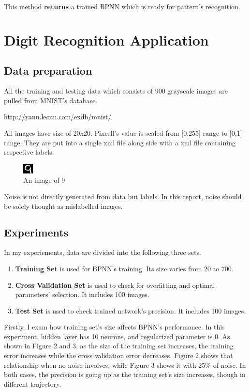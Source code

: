 \documentclass[a4paper, 11pt]{article}
\begin{document}
This method \textbf{returns} a trained BPNN which is ready for pattern's recognition.

\newpage
\section{Digit Recognition Application}
\subsection{Data preparation}
All the training and testing data which consists of 900 grayscale images are pulled from MNIST's database.
\begin{center}\url{http://yann.lecun.com/exdb/mnist/}\end{center}
All images have size of 20x20. Pixcell's value is scaled from [0,255] range to [0,1] range. They are put into a single xml file along side with a xml file containing respective labels.
\begin{figure}[ht]
  \centering
  \includegraphics[scale=5]{img0014}
  \caption{An image of 9}
  \label{fig:9}
\end{figure}
Noise is not directly generated from data but labels. In this report, noise should be solely thought as mislabelled images.
\subsection{Experiments}
In my experiements, data are divided into the following three sets.
\begin{enumerate}
\item \textbf{Training Set} is used for BPNN's training. Its size varies from 20 to 700.
\item \textbf{Cross Validation Set} is used to check for overfitting and optimal parameters' selection. It includes 100 images.
\item \textbf{Test Set} is used to check trained network's precision. It includes 100 images.
\end{enumerate}
Firstly, I exam how training set's size affects BPNN's performance. In this experiment, hidden layer has 10 neurons, and regularized parameter is 0. As shown in Figure 2 and 3, as the size of the training set increases, the training error increases while the cross validation error decreases. Figure 2 shows that relationship when no noise involves, while Figure 3 shows it with 25\% of noise. In both cases, the precision is going up as the training set's size increases, though in different trajectory.
\end{document}
